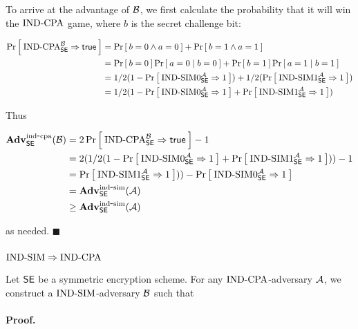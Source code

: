 To arrive at the advantage of $\advB$, we first calculate the probability
that it will win the $\INDCPA$ game, where $b$ is the secret challenge bit:

\begin{align*}
  \Prob{\INDCPA^{\advB}_{\SEscheme} \Rightarrow \ctrue}
  &= \Prob{b = 0 \wedge a = 0} + \Prob{b = 1 \wedge a = 1} \\
  &= \Prob{b = 0}\Prob{a = 0 \mid b = 0} + \Prob{b = 1}\Prob{a = 1 \mid b = 1} \\
  &= 1/2(1 - \Prob{\INDSIM0^{\advA}_{\SEscheme} \Rightarrow 1})
     + 1/2(\Prob{\INDSIM1^{\advA}_{\SEscheme} \Rightarrow 1}) \\
  &= 1/2(1 - \Prob{\INDSIM0^{\advA}_{\SEscheme} \Rightarrow 1}
          + \Prob{\INDSIM1^{\advA}_{\SEscheme} \Rightarrow 1})
\end{align*}

Thus

\begin{align*}
  \AdvINDCPA{\SEscheme}{\advB} &=
    2 \Prob{\INDCPA^{\advB}_{\SEscheme} \Rightarrow \ctrue} - 1 \\
  &= 2(1/2(1 - \Prob{\INDSIM0^{\advA}_{\SEscheme} \Rightarrow 1}
          + \Prob{\INDSIM1^{\advA}_{\SEscheme} \Rightarrow 1})) -1 \\
  &= \Prob{\INDSIM1^{\advA}_{\SEscheme} \Rightarrow 1})) -
     \Prob{\INDSIM0^{\advA}_{\SEscheme} \Rightarrow 1} \\
  &= \AdvINDSIM{\SEscheme}{\advA} \\
  &\geq \AdvINDSIM{\SEscheme}{\advA} \\
\end{align*}

as needed. $\blacksquare$


\subsubsection*{$\INDSIM \Rightarrow \INDCPA$}

Let $\SEscheme$ be a symmetric encryption scheme. For any $\INDCPA$-adversary
$\advA$, we construct a $\INDSIM$-adversary $\advB$ such that

\bnm
\AdvINDCPA{\SEscheme}{\advA} \leq \AdvINDSIM{\SEscheme}{\advB}
\enm

\paragraph{Proof.}


